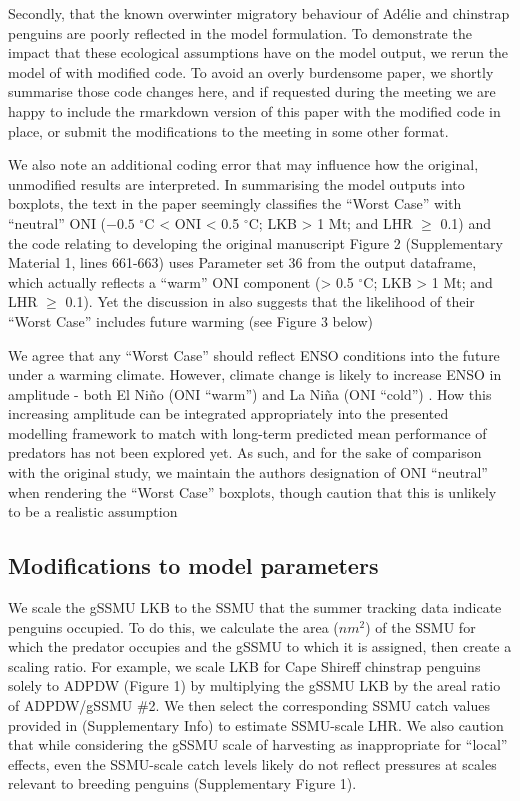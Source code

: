 \documentclass[]{elsarticle} %
\begin{document}
Secondly, that the known overwinter migratory behaviour of Adélie and
chinstrap penguins are poorly reflected in the model formulation. To
demonstrate the impact that these ecological assumptions have on the
model output, we rerun the model of \citet{Watters2020} with modified
code. To avoid an overly burdensome paper, we shortly summarise those
code changes here, and if requested during the meeting we are happy to
include the rmarkdown version of this paper with the modified code in
place, or submit the modifications to the meeting in some other format.

We also note an additional coding error that may influence how the
original, unmodified results are interpreted. In summarising the model
outputs into boxplots, the text in the paper seemingly classifies the
``Worst Case'' with ``neutral'' ONI (\({-0.5}\) \(^{\circ}\)C
\textless{} ONI \textless{} 0.5 \(^{\circ}\)C; LKB \textgreater{} 1 Mt;
and LHR \(\geqslant\) 0.1) and the code relating to developing the
original manuscript Figure 2 (Supplementary Material 1, lines 661-663)
uses Parameter set 36 from the output dataframe, which actually reflects
a ``warm'' ONI component (\textgreater{} 0.5 \(^{\circ}\)C; LKB
\textgreater{} 1 Mt; and LHR \(\geqslant\) 0.1). Yet the discussion in
\citet{Watters2020} also suggests that the likelihood of their ``Worst
Case'' includes future warming (see Figure 3 below)

We agree that any ``Worst Case'' should reflect ENSO conditions into the
future under a warming climate. However, climate change is likely to
increase ENSO in amplitude - both El Niño (ONI ``warm'') and La Niña
(ONI ``cold'') \citep{capotondiUnderstandingENSODiversity2015}. How this
increasing amplitude can be integrated appropriately into the presented
modelling framework to match with long-term predicted mean performance
of predators has not been explored yet. As such, and for the sake of
comparison with the original study, we maintain the authors designation
of ONI ``neutral'' when rendering the ``Worst Case'' boxplots, though
caution that this is unlikely to be a realistic assumption

\subsection{Modifications to model
parameters}\label{modifications-to-model-parameters}

We scale the gSSMU LKB to the SSMU that the summer tracking data
indicate penguins occupied. To do this, we calculate the area (\(nm^2\))
of the SSMU for which the predator occupies and the gSSMU to which it is
assigned, then create a scaling ratio. For example, we scale LKB for
Cape Shireff chinstrap penguins solely to ADPDW (Figure 1) by
multiplying the gSSMU LKB by the areal ratio of ADPDW/gSSMU \#2. We then
select the corresponding SSMU catch values provided in
\citet{Watters2020} (Supplementary Info) to estimate SSMU-scale LHR. We
also caution that while considering the gSSMU scale of harvesting as
inappropriate for ``local'' effects, even the SSMU-scale catch levels
likely do not reflect pressures at scales relevant to breeding penguins
(Supplementary Figure 1).
\end{document}
